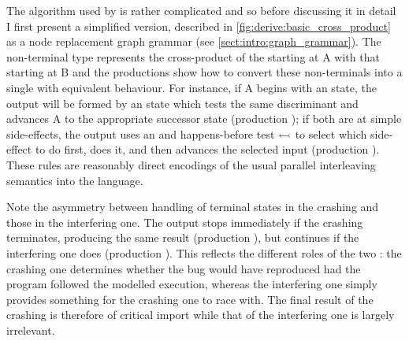 The algorithm used by {\technique} is rather complicated and so before
discussing it in detail I first present a simplified version,
described in \autoref{fig:derive:basic_cross_product} as a node
replacement graph grammar (see \autoref{sect:intro:graph_grammar}).
The non-terminal type  represents the cross-product of
the {\StateMachine} starting at A with that starting at B and the
productions show how to convert these non-terminals into a single
{\StateMachine} with equivalent behaviour.  For instance, if
{\StateMachine} A begins with an  state, the output
{\StateMachine} will be formed by an  state which tests the
same discriminant and advances A to the appropriate successor state
(production ); if both {\StateMachines} are at simple
side-effects, the output {\StateMachine} uses an  and
happens-before test $\leftarrowtail$ to select which side-effect
to do first, does it, and then advances the selected input
{\StateMachine} (production ).  These rules are
reasonably direct encodings of the usual parallel interleaving
semantics into the {\StateMachine} language.

Note the asymmetry between handling of terminal states in the crashing
{\StateMachine} and those in the interfering one.  The output
{\StateMachine} stops immediately if the crashing {\StateMachine}
terminates, producing the same result (production ), but
continues if the interfering {\StateMachine} one does (production
).  This reflects the different roles of the two
           {\StateMachines}: the crashing one determines whether the
           bug would have reproduced had the program followed the
           modelled execution, whereas the interfering one simply
           provides something for the crashing one to race with.  The
           final result of the crashing {\StateMachine} is therefore
           of critical import while that of the interfering one is
           largely irrelevant.

